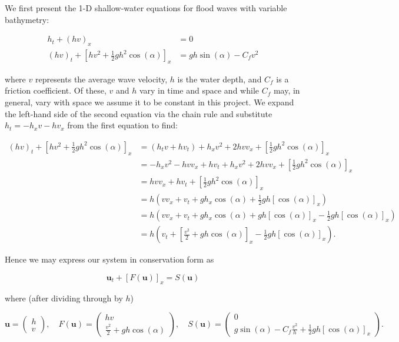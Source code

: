 We first present the 1-D shallow-water equations for flood waves with variable bathymetry\cite{whitham1999_ch3}:

\begin{align*}
    h_t + (h v)_x &= 0 \\
    (h v)_t + \left[ hv^2 + \frac{1}{2} g h^2 \cos{(\alpha)} \right]_x &= g h \sin{(\alpha)} - C_f v^2
\end{align*}

where $v$ represents the average wave velocity, $h$ is the water depth, and $C_f$ is a friction
coefficient. Of these, $v$ and $h$ vary in time and space and while $C_f$ may, in general, vary with space we assume
it to be constant in this project. We expand the left-hand side of the second equation via the chain rule and 
substitute $h_t = -h_x v - h v_x$ from the first equation to find: 

\begin{align*}
    (h v)_t + \left[ hv^2 + \frac{1}{2} g h^2 \cos{(\alpha)} \right]_x 
        &= \left( h_t v + h v_t \right) + h_x v^2 + 2 h v v_x + \left[ \frac{1}{2} g h^2 \cos{(\alpha)} \right]_x \\
        &= -h_x v^2 - h v v_x + h v_t + h_x v^2 + 2 h v v_x + \left[ \frac{1}{2} g h^2 \cos{(\alpha)} \right]_x \\
        &=  h v v_x + h v_t + \left[ \frac{1}{2} g h^2 \cos{(\alpha)} \right]_x \\
        &=  h \left( v v_x + v_t + g h_x \cos{(\alpha)} + \frac{1}{2} g h [\cos{(\alpha)}]_x \right) \\
        &=  h \left( v v_x + v_t + g h_x \cos{(\alpha)} + g h [\cos{(\alpha)}]_x - \frac{1}{2} g h [\cos{(\alpha)}]_x \right) \\
        &=  h \left( v_t + \left[ \frac{v^2}{2} + g h \cos{(\alpha)} \right]_x - \frac{1}{2} g h [\cos{(\alpha)}]_x \right).
\end{align*}

Hence we may express our system in conservation form as

$$
    \textbf{u}_t + \left[ F(\textbf{u}) \right]_x = S(\textbf{u})
$$

where (after dividing through by $h$)

$$
\textbf{u} = \begin{pmatrix}
    h \\
    v
\end{pmatrix}, \quad F(\textbf{u}) = \begin{pmatrix}
    hv \\
    \frac{v^2}{2} + g h \cos{(\alpha)}
\end{pmatrix}, \quad S(\textbf{u}) = \begin{pmatrix}
    0 \\
    g \sin{(\alpha)} - C_f \frac{v^2}{h} + \frac{1}{2} g h [\cos{(\alpha)}]_x
\end{pmatrix}.
$$

